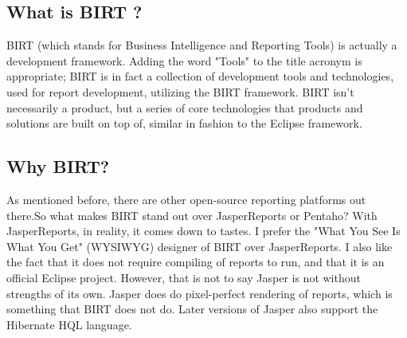 \subsection{What is BIRT ?}
BIRT (which stands for Business Intelligence and Reporting Tools) is actually a
development framework. Adding the word "Tools" to the title acronym is
appropriate; BIRT is in fact a collection of development tools and technologies,
used for report development, utilizing the BIRT framework. BIRT isn't necessarily
a product, but a series of core technologies that products and solutions are
built on top of, similar in fashion to the Eclipse framework.

\subsection{Why BIRT?}
As mentioned before, there are other open-source reporting platforms out there.So
what makes BIRT stand out over JasperReports or Pentaho? With JasperReports, in
reality, it comes down to tastes. I prefer the "What You See Is What You Get"
(WYSIWYG) designer of BIRT over JasperReports. I also like the fact that it does
not require compiling of reports to run, and that it is an official Eclipse
project. However, that is not to say Jasper is not without strengths of its own.
Jasper does do pixel-perfect rendering of reports, which is something that BIRT
does not do. Later versions of Jasper also support the Hibernate HQL language.